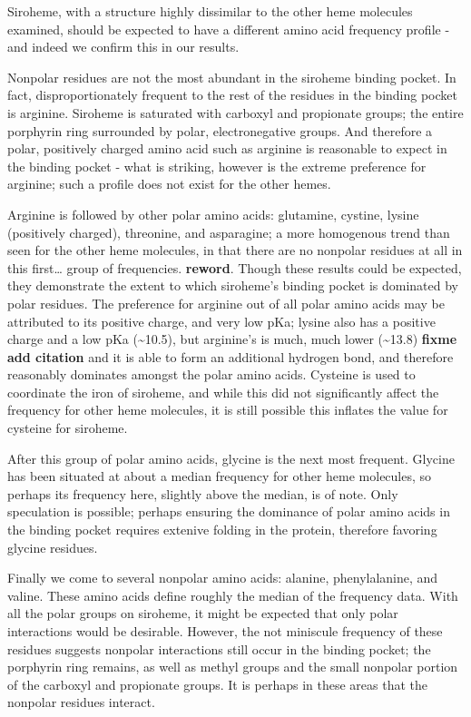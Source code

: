 \documentclass[a4paper, nobind]{templates/ociamthesis}
\begin{document}
Siroheme, with a structure highly dissimilar to the other heme molecules examined, should be expected to have a different amino acid frequency profile - and indeed we confirm this in our results.

Nonpolar residues are not the most abundant in the siroheme binding pocket. In fact, disproportionately frequent to the rest of the residues in the binding pocket is arginine. Siroheme is saturated with carboxyl and propionate groups; the entire porphyrin ring surrounded by polar, electronegative groups. And therefore a polar, positively charged amino acid such as arginine is reasonable to expect in the binding pocket - what is striking, however is the extreme preference for arginine; such a profile does not exist for the other hemes.

Arginine is followed by other polar amino acids: glutamine, cystine, lysine (positively charged), threonine, and asparagine; a more homogenous trend than seen for the other heme molecules, in that there are no nonpolar residues at all in this first\ldots{} group of frequencies. \textbf{reword}. Though these results could be expected, they demonstrate the extent to which siroheme's binding pocket is dominated by polar residues. The preference for arginine out of all polar amino acids may be attributed to its positive charge, and very low pKa; lysine also has a positive charge and a low pKa (\textasciitilde10.5), but arginine's is much, much lower (\textasciitilde13.8) \textbf{fixme add citation} and it is able to form an additional hydrogen bond, and therefore reasonably dominates amongst the polar amino acids. Cysteine is used to coordinate the iron of siroheme, and while this did not significantly affect the frequency for other heme molecules, it is still possible this inflates the value for cysteine for siroheme.

After this group of polar amino acids, glycine is the next most frequent. Glycine has been situated at about a median frequency for other heme molecules, so perhaps its frequency here, slightly above the median, is of note. Only speculation is possible; perhaps ensuring the dominance of polar amino acids in the binding pocket requires extenive folding in the protein, therefore favoring glycine residues.

Finally we come to several nonpolar amino acids: alanine, phenylalanine, and valine. These amino acids define roughly the median of the frequency data. With all the polar groups on siroheme, it might be expected that only polar interactions would be desirable. However, the not miniscule frequency of these residues suggests nonpolar interactions still occur in the binding pocket; the porphyrin ring remains, as well as methyl groups and the small nonpolar portion of the carboxyl and propionate groups. It is perhaps in these areas that the nonpolar residues interact.
\end{document}
